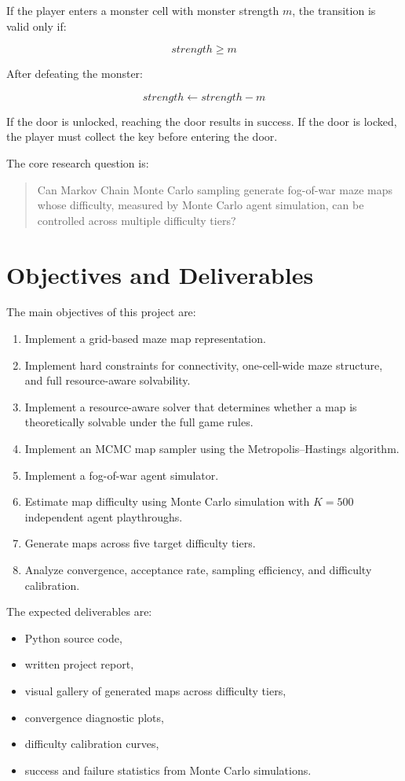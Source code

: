 \documentclass[11pt]{article}
\begin{document}
If the player enters a monster cell with monster strength $m$, the transition is valid only if:

\[
strength \geq m
\]

After defeating the monster:

\[
strength \leftarrow strength - m
\]

If the door is unlocked, reaching the door results in success. If the door is locked, the player must collect the key before entering the door.

The core research question is:

\begin{quote}
Can Markov Chain Monte Carlo sampling generate fog-of-war maze maps whose difficulty, measured by Monte Carlo agent simulation, can be controlled across multiple difficulty tiers?
\end{quote}

\section{Objectives and Deliverables}

The main objectives of this project are:

\begin{enumerate}[noitemsep]
    \item Implement a grid-based maze map representation.
    \item Implement hard constraints for connectivity, one-cell-wide maze structure, and full resource-aware solvability.
    \item Implement a resource-aware solver that determines whether a map is theoretically solvable under the full game rules.
    \item Implement an MCMC map sampler using the Metropolis--Hastings algorithm.
    \item Implement a fog-of-war agent simulator.
    \item Estimate map difficulty using Monte Carlo simulation with $K = 500$ independent agent playthroughs.
    \item Generate maps across five target difficulty tiers.
    \item Analyze convergence, acceptance rate, sampling efficiency, and difficulty calibration.
\end{enumerate}

The expected deliverables are:

\begin{itemize}[noitemsep]
    \item Python source code,
    \item written project report,
    \item visual gallery of generated maps across difficulty tiers,
    \item convergence diagnostic plots,
    \item difficulty calibration curves,
    \item success and failure statistics from Monte Carlo simulations.
\end{itemize}
\end{document}
